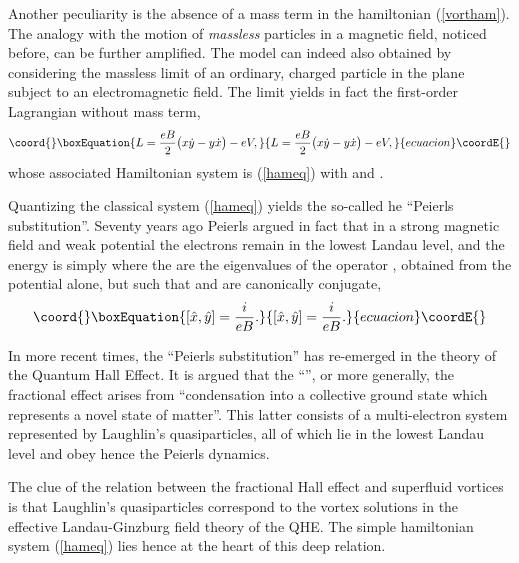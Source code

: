 \documentclass[a4paper,12pt]{article}
\begin{document}
 Another peculiarity is the absence of a mass term in the hamiltonian
(\ref{vortham}). 
The analogy with the motion of {\it massless} particles in a
magnetic field, noticed before\cite{HMC},
can be further amplified.
The model can indeed also obtained by considering the
massless limit of an ordinary, charged particle in the plane
subject to an electromagnetic field\cite{DJT}.
The \coordHE{} limit yields in fact the first-order Lagrangian
without mass term,
\begin{equation}\coord{}\boxEquation{
	L=\frac{eB}{2}\big(x\dot{y}-y\dot{x}\big)-eV,
\label{redlag}
}{
	L=\frac{eB}{2}\big(x\dot{y}-y\dot{x}\big)-eV,
}{ecuacion}\coordE{}\end{equation}
whose associated Hamiltonian system is (\ref{hameq}) with 
\coordHE{} and \coordHE{}.

Quantizing the classical system (\ref{hameq}) yields the so-called
he ``Peierls substitution''.
Seventy years ago Peierls\cite{Peierls} argued in fact that
in a strong  magnetic field \coordHE{} and weak potential \coordHE{}
the electrons remain in the lowest Landau 
level, and the energy is simply  
\coordHE{}
where the
\coordHE{} are the eigenvalues of the operator 
\coordHE{}, obtained from the 
potential alone, but such that \coordHE{} and \coordHE{} are
canonically conjugate,
\begin{equation}\coord{}\boxEquation{ 
[\hat{x},\hat{y}]=\frac{i}{eB}. 
\label{NCcoord}
}{ 
[\hat{x},\hat{y}]=\frac{i}{eB}. 
}{ecuacion}\coordE{}\end{equation}

In more recent times, the ``Peierls substitution'' has re-emerged 
in the theory of the Quantum Hall Effect\cite{LAUGH,GJ,QHE}.
It is argued\cite{LAUGH} that the ``\coordHE{}'', or more generally,
the fractional effect arises from  
``condensation into a collective ground state which
 represents a novel state of matter''\cite{LAUGH}.
 This latter
consists of a multi-electron system represented  by Laughlin's
 quasiparticles\cite{QHE}, all of which lie  in the lowest Landau
 level and obey hence the Peierls dynamics. 

 The clue of the relation between the fractional Hall effect and
superfluid vortices is that Laughlin's quasiparticles correspond to
 the vortex solutions in the effective Landau-Ginzburg field theory
 of the QHE\cite{ZHK}. The simple hamiltonian system 
(\ref{hameq}) lies hence at the heart of this deep relation.
\goodbreak
\end{document}
